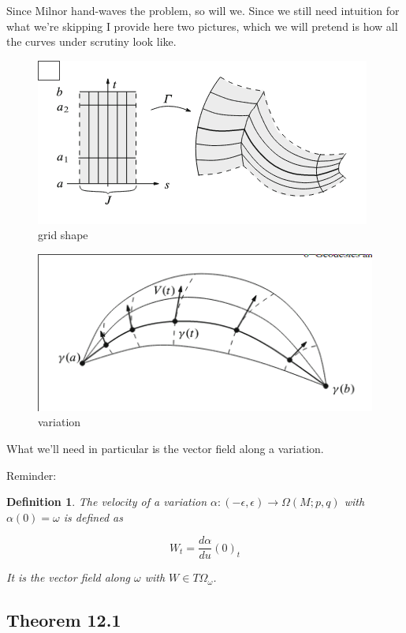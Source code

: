 \documentclass{article}
\newtheorem{def}{Definition}
\begin{document}
Since Milnor hand-waves the problem, so will we. Since we still need intuition for what we're
skipping I provide here two pictures, which we will pretend is how all the curves under scrutiny
look like.

\begin{figure}
    \includegraphics{img/grid.png}
    \caption{grid shape}
    \label{fig:boat1}
\end{figure}
\begin{figure}
    \includegraphics{img/sail.png}
    \caption{variation}
    \label{fig:boat1}
\end{figure}



What we'll need in particular is the vector field along a variation.

Reminder:

\begin{def}
\label{def:vel_of_var}
    The velocity of a variation $\alpha: (-\epsilon, \epsilon) \rightarrow \Omega(M;p,q)$ with
    $\alpha(0) = \omega$ is defined as

    \[ W_t = \frac{d\alpha}{du}(0)_t \]

    It is the vector field along $\omega$ with $W \in T\Omega_{\omega}$.
\end{def}
\subsection{Theorem 12.1}
\end{document}
